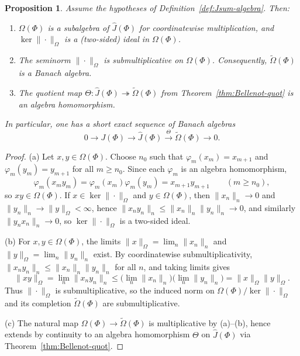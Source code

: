 \documentclass[reqno]{amsart}
\theoremstyle{plain}
\newtheorem{proposition}[theorem]{Proposition}
\theoremstyle{definition}
\theoremstyle{remark}
\renewcommand{\le}{\leqslant}
\renewcommand{\ge}{\geqslant}
\begin{document}
\begin{proposition}\label{prop:Omega-algebra}
Assume the hypotheses of Definition~\ref{def:Jsum-algebra}. Then:
\begin{enumerate}[label={\rm(\alph*)}]
\item $\Omega(\Phi)$ is a subalgebra of $\widehat{J}(\Phi)$ for coordinatewise multiplication, and
      $\ker\|\cdot\|_{\Omega}$ is a (two-sided) ideal in $\Omega(\Phi)$.
\item The seminorm $\|\cdot\|_{\Omega}$ is submultiplicative on $\Omega(\Phi)$.
      Consequently, $\widetilde{\Omega}(\Phi)$ is a Banach algebra.
\item The quotient map $\Theta\colon \widehat{J}(\Phi)\twoheadrightarrow \widetilde{\Omega}(\Phi)$
      from Theorem~\ref{thm:Bellenot-quot} is an algebra homomorphism.
\end{enumerate}
In particular, one has a short exact sequence of Banach algebras
\[
0\longrightarrow J(\Phi)\longrightarrow \widehat{J}(\Phi)
\overset{\Theta}{\longrightarrow}\widetilde{\Omega}(\Phi)\longrightarrow 0.
\]
\end{proposition}

\begin{proof}
(a) Let $x,y\in\Omega(\Phi)$. Choose $n_0$ such that $\varphi_m(x_m)=x_{m+1}$ and $\varphi_m(y_m)=y_{m+1}$
for all $m\ge n_0$. Since each $\varphi_m$ is an algebra homomorphism,
\[
\varphi_m(x_my_m)=\varphi_m(x_m)\varphi_m(y_m)=x_{m+1}y_{m+1}\qquad (m\ge n_0),
\]
so $xy\in\Omega(\Phi)$. If $x\in\ker\|\cdot\|_{\Omega}$ and $y\in\Omega(\Phi)$, then
$\|x_n\|_n\to 0$ and $\|y_n\|_n\to \|y\|_{\Omega}<\infty$, hence
$\|x_ny_n\|_n\le \|x_n\|_n\|y_n\|_n\to 0$, and similarly $\|y_nx_n\|_n\to 0$, so $\ker\|\cdot\|_{\Omega}$
is a two-sided ideal.

(b) For $x,y\in\Omega(\Phi)$, the limits $\|x\|_\Omega=\lim_n\|x_n\|_n$ and $\|y\|_\Omega=\lim_n\|y_n\|_n$ exist.
By coordinatewise submultiplicativity, $\|x_ny_n\|_n\le \|x_n\|_n\|y_n\|_n$ for all $n$, and taking limits gives
\[
\|xy\|_\Omega=\lim_n\|x_ny_n\|_n \le \Big(\lim_n\|x_n\|_n\Big)\Big(\lim_n\|y_n\|_n\Big)=\|x\|_\Omega\|y\|_\Omega.
\]
Thus $\|\cdot\|_\Omega$ is submultiplicative, so the induced norm on $\Omega(\Phi)/\ker\|\cdot\|_\Omega$
and its completion $\widetilde{\Omega}(\Phi)$ are submultiplicative.

(c) The natural map $\Omega(\Phi)\to\widetilde{\Omega}(\Phi)$ is multiplicative by (a)--(b), hence extends by continuity
to an algebra homomorphism $\Theta$ on $\widehat{J}(\Phi)$ via Theorem~\ref{thm:Bellenot-quot}.
\end{proof}
\end{document}
